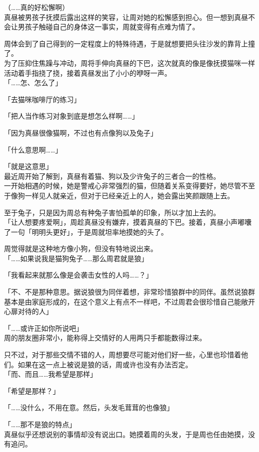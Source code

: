 （……真的好松懈啊）\\

真昼被男孩子抚摸后露出这样的笑容，让周对她的松懈感到担心。但一想到真昼不会让男孩子触碰自己的身体这一事实，周就变得有点难为情了。

周体会到了自己得到的一定程度上的特殊待遇，于是就想要把头往沙发的靠背上撞了。\\

为了压抑住焦躁与冲动，周将手伸向真昼的下巴，这次就真的像是像抚摸猫咪一样活动着手指挠了挠，接着真昼发出了小小的咿呀一声。\\

「……怎、怎么了」

「去猫咪咖啡厅的练习」

「把人当作练习对象到底是想怎么样啊……」

「因为真昼很像猫啊，不过也有点像狗以及兔子」

「什么意思啊……」

「就是这意思」\\

最近周开始了解到，真昼有着猫、狗以及少许兔子的三者合一的性格。\\

一开始相遇的时候，她是警戒心非常强烈的猫，但随着关系变得要好，她尽管不至于像狗一样见人就亲近，但对于已经亲近上的人，她会露出笑颜跟随上去。

至于兔子，只是因为周总有种兔子害怕孤单的印象，所以才加上去的。\\

「让人想要疼爱啊」，周趁真昼没有嫌弃，摸着真昼的下巴。接着，真昼小声嘟囔了一句「明明头更好」，于是周就坦率地摸她的头了。

周觉得就是这种地方像小狗，但没有特地说出来。\\

「……如果说我是猫狗兔子……那么周君就是狼」

「我看起来就那么像是会袭击女性的人吗……？」

「不、不是那种意思。据说狼很为同伴着想，非常珍惜狼群中的同伴。虽然说狼群基本是由家庭形成的，在这个意义上有点不一样吧，不过周君会很珍惜自己能敞开心扉对待的人」

「……或许正如你所说吧」\\

周的朋友圈非常小，能称得上交情好的人用两只手都能数得过来。

只不过，对于那些交情不错的人，周想要尽可能对他们好一些，心里也珍惜着他们。如果在这一点上被说是狼的话，周或许也没有办法否定。\\

「而、而且……我希望是那样」

「希望是那样？」

「……没什么，不用在意。然后，头发毛茸茸的也像狼」

「……那不是狼的特点」\\

真昼似乎还想说别的事情却没有说出口。她摸着周的头发，于是周也任由她摸，没有追问。
